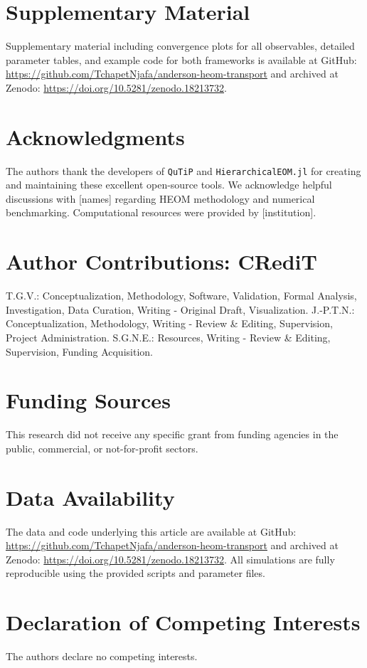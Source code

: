 \documentclass[preprint,1p]{elsarticle}
\begin{document}
\section*{Supplementary Material}

Supplementary material including convergence plots for all observables, detailed parameter tables, and example code for both frameworks is available at GitHub: \url{https://github.com/TchapetNjafa/anderson-heom-transport} and archived at Zenodo: \url{https://doi.org/10.5281/zenodo.18213732}.

\section*{Acknowledgments}

The authors thank the developers of \texttt{QuTiP} and \texttt{HierarchicalEOM.jl} for creating and maintaining these excellent open-source tools. We acknowledge helpful discussions with [names] regarding HEOM methodology and numerical benchmarking. Computational resources were provided by [institution].

\section*{Author Contributions: CRediT}

T.G.V.: Conceptualization, Methodology, Software, Validation, Formal Analysis, Investigation, Data Curation, Writing - Original Draft, Visualization. J.-P.T.N.: Conceptualization, Methodology, Writing - Review \& Editing, Supervision, Project Administration. S.G.N.E.: Resources, Writing - Review \& Editing, Supervision, Funding Acquisition.

\section*{Funding Sources}

This research did not receive any specific grant from funding agencies in the public, commercial, or not-for-profit sectors.

\section*{Data Availability}

The data and code underlying this article are available at GitHub: \url{https://github.com/TchapetNjafa/anderson-heom-transport} and archived at Zenodo: \url{https://doi.org/10.5281/zenodo.18213732}. All simulations are fully reproducible using the provided scripts and parameter files.

\section*{Declaration of Competing Interests}

The authors declare no competing interests.



\end{document}

